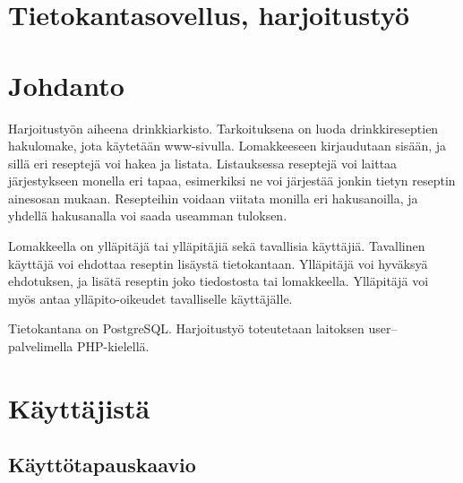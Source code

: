 \documentclass[a4paper]{article}
\begin{document}
\section*{Tietokantasovellus, harjoitustyö}
\section{Johdanto}

Harjoitustyön aiheena drinkkiarkisto. Tarkoituksena on luoda drinkkireseptien hakulomake, jota käytetään www-sivulla. Lomakkeeseen kirjaudutaan sisään, ja sillä eri reseptejä voi hakea ja listata. Listauksessa reseptejä voi laittaa järjestykseen monella eri tapaa, esimerkiksi ne voi järjestää jonkin tietyn reseptin ainesosan mukaan. Resepteihin voidaan viitata monilla eri hakusanoilla, ja yhdellä hakusanalla voi saada useamman tuloksen. 

Lomakkeella on ylläpitäjä tai ylläpitäjiä sekä tavallisia käyttäjiä. Tavallinen käyttäjä voi ehdottaa reseptin lisäystä tietokantaan. Ylläpitäjä voi hyväksyä ehdotuksen, ja lisätä reseptin joko tiedostosta tai lomakkeella. Ylläpitäjä voi myös antaa ylläpito-oikeudet tavalliselle käyttäjälle. 

Tietokantana on PostgreSQL. Harjoitustyö toteutetaan laitoksen user--palvelimella PHP-kielellä. 

%

\section{Käyttäjistä}

\subsection{Käyttötapauskaavio}
\end{document}
